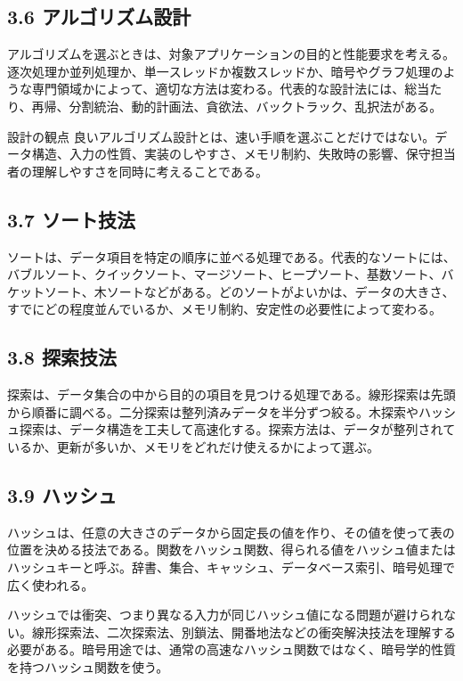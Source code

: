 \documentclass[a4paper,11pt]{ltjsarticle}
\begin{document}
\subsection{3.6 アルゴリズム設計}

アルゴリズムを選ぶときは、対象アプリケーションの目的と性能要求を考える。逐次処理か並列処理か、単一スレッドか複数スレッドか、暗号やグラフ処理のような専門領域かによって、適切な方法は変わる。代表的な設計法には、総当たり、再帰、分割統治、動的計画法、貪欲法、バックトラック、乱択法がある。

\begin{importantbox}{設計の観点}
良いアルゴリズム設計とは、速い手順を選ぶことだけではない。データ構造、入力の性質、実装のしやすさ、メモリ制約、失敗時の影響、保守担当者の理解しやすさを同時に考えることである。

\end{importantbox}

\subsection{3.7 ソート技法}

ソートは、データ項目を特定の順序に並べる処理である。代表的なソートには、バブルソート、クイックソート、マージソート、ヒープソート、基数ソート、バケットソート、木ソートなどがある。どのソートがよいかは、データの大きさ、すでにどの程度並んでいるか、メモリ制約、安定性の必要性によって変わる。

\subsection{3.8 探索技法}

探索は、データ集合の中から目的の項目を見つける処理である。線形探索は先頭から順番に調べる。二分探索は整列済みデータを半分ずつ絞る。木探索やハッシュ探索は、データ構造を工夫して高速化する。探索方法は、データが整列されているか、更新が多いか、メモリをどれだけ使えるかによって選ぶ。

\subsection{3.9 ハッシュ}

ハッシュは、任意の大きさのデータから固定長の値を作り、その値を使って表の位置を決める技法である。関数をハッシュ関数、得られる値をハッシュ値またはハッシュキーと呼ぶ。辞書、集合、キャッシュ、データベース索引、暗号処理で広く使われる。

ハッシュでは衝突、つまり異なる入力が同じハッシュ値になる問題が避けられない。線形探索法、二次探索法、別鎖法、開番地法などの衝突解決技法を理解する必要がある。暗号用途では、通常の高速なハッシュ関数ではなく、暗号学的性質を持つハッシュ関数を使う。
\end{document}
